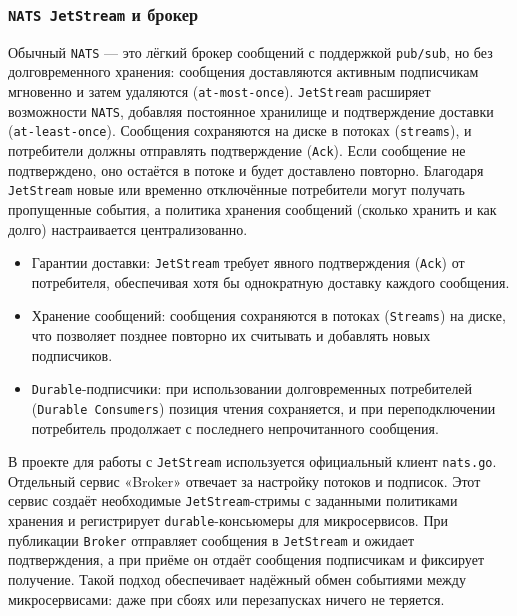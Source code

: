 \subsubsection*{\texttt{NATS JetStream} и брокер}
Обычный \texttt{NATS} — это лёгкий брокер сообщений с поддержкой \texttt{pub/sub}, но без долговременного хранения: сообщения доставляются активным подписчикам мгновенно и затем удаляются (\texttt{at-most-once}). \texttt{JetStream} расширяет возможности \texttt{NATS}, добавляя постоянное хранилище и подтверждение доставки (\texttt{at-least-once}). Сообщения сохраняются на диске в потоках (\texttt{streams}), и потребители должны отправлять подтверждение (\texttt{Ack}). Если сообщение не подтверждено, оно остаётся в потоке и будет доставлено повторно. Благодаря \texttt{JetStream} новые или временно отключённые потребители могут получать пропущенные события, а политика хранения сообщений (сколько хранить и как долго) настраивается централизованно.
\begin{itemize}
    \item Гарантии доставки: \texttt{JetStream} требует явного подтверждения (\texttt{Ack}) от потребителя, обеспечивая хотя бы однократную доставку каждого сообщения.
    \item Хранение сообщений: сообщения сохраняются в потоках (\texttt{Streams}) на диске, что позволяет позднее повторно их считывать и добавлять новых подписчиков.
    \item \texttt{Durable}-подписчики: при использовании долговременных потребителей (\texttt{Durable Consumers}) позиция чтения сохраняется, и при переподключении потребитель продолжает с последнего непрочитанного сообщения.
\end{itemize}
\noindent В проекте для работы с \texttt{JetStream} используется официальный клиент \texttt{nats.go}. Отдельный сервис «Broker» отвечает за настройку потоков и подписок. Этот сервис создаёт необходимые \texttt{JetStream}-стримы с заданными политиками хранения и регистрирует \texttt{durable}-консьюмеры для микросервисов. При публикации \texttt{Broker} отправляет сообщения в \texttt{JetStream} и ожидает подтверждения, а при приёме он отдаёт сообщения подписчикам и фиксирует получение. Такой подход обеспечивает надёжный обмен событиями между микросервисами: даже при сбоях или перезапусках ничего не теряется.


